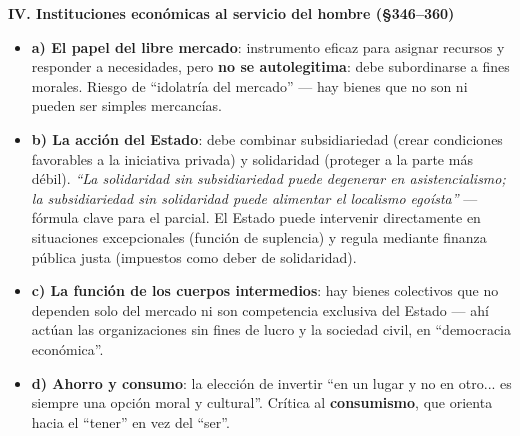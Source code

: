 \documentclass[10pt,a4paper]{article}
\begin{document}
\medskip\noindent \textbf{IV. Instituciones económicas al servicio del hombre (\S{}346--360)}\par\nopagebreak
\begin{itemize}
\item \textbf{a) El papel del libre mercado}: instrumento eficaz para asignar recursos y responder a necesidades, pero \textbf{no se autolegitima}: debe subordinarse a fines morales. Riesgo de ``idolatría del mercado'' --- hay bienes que no son ni pueden ser simples mercancías.
\item \textbf{b) La acción del Estado}: debe combinar subsidiariedad (crear condiciones favorables a la iniciativa privada) y solidaridad (proteger a la parte más débil). \textit{``La solidaridad sin subsidiariedad puede degenerar en asistencialismo; la subsidiariedad sin solidaridad puede alimentar el localismo egoísta''} --- fórmula clave para el parcial. El Estado puede intervenir directamente en situaciones excepcionales (función de suplencia) y regula mediante finanza pública justa (impuestos como deber de solidaridad).
\item \textbf{c) La función de los cuerpos intermedios}: hay bienes colectivos que no dependen solo del mercado ni son competencia exclusiva del Estado --- ahí actúan las organizaciones sin fines de lucro y la sociedad civil, en ``democracia económica''.
\item \textbf{d) Ahorro y consumo}: la elección de invertir ``en un lugar y no en otro... es siempre una opción moral y cultural''. Crítica al \textbf{consumismo}, que orienta hacia el ``tener'' en vez del ``ser''.
\end{itemize}
\end{document}
